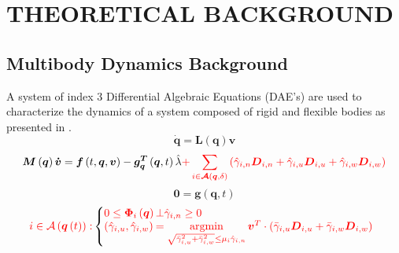 \documentclass[12pt,onecolumn]{report}
\DeclareMathOperator*{\argminB}{argmin}
\begin{document}

\chapter{THEORETICAL BACKGROUND}\label{c:background}

\section{Multibody Dynamics Background}\label{s:MBD}

A system of index 3 Differential Algebraic Equations (DAE's) are used to characterize the dynamics of a system composed of rigid and flexible bodies as presented in \cite{Chrono2016}.
%
\begin{equation}\label{e:LinTrans}
\boldsymbol{\dot{q}}= \boldsymbol{L}\left(\boldsymbol{q}\right)\boldsymbol{v}
\end{equation}
%
\begin{equation}\label{e:ForceBalance}
\boldsymbol{M}\left(\boldsymbol{q}\right)\boldsymbol{\dot{v}} = \boldsymbol{f}\left(t,\boldsymbol{q},\boldsymbol{v}\right) - \boldsymbol{g^T_q} \left(\boldsymbol{q},t\right)\hat{\lambda}  \textcolor{red}{ + \sum\limits_{i \in \boldsymbol{\mathcal{A}}\left(\boldsymbol{q},\delta\right) }\left(\hat\gamma_{i,n}\boldsymbol{D}_{i,n} + \hat\gamma_{i,u}\boldsymbol{D}_{i,u} + \hat\gamma_{i,w}\boldsymbol{D}_{i,w}\right)}
\end{equation}
%
\begin{equation}\label{e:Constraints}
\boldsymbol{0} = \boldsymbol{g}\left(\boldsymbol{q},t\right)
\end{equation}
%
{\color{red}\begin{equation}\label{e:Inequalities}
\textcolor{red}{i \in \mathcal{A}\left(\boldsymbol{q}\left(t\right)\right):}
\left\{
     \begin{array}{@{}l@{\thinspace}l}
      \textcolor{red}{0\le\boldsymbol{\Phi}_i \left(\boldsymbol{q}\right)} &\textcolor{red}{\bot \hat\gamma_{i,n}  \ge 0}\\
      \textcolor{red}{\left(\hat\gamma_{i,u},\hat\gamma_{i,w}\right)} &\textcolor{red}{= \argminB\limits_{\sqrt{\bar\gamma_{i,u}^2 + \bar\gamma_{i,w}^2}\le\mu_i \hat\gamma_{i,n}} \boldsymbol{v}^T \cdot \left(\bar\gamma_{i,u}\boldsymbol{D}_{i,u} + \bar\gamma_{i,w}\boldsymbol{D}_{i,w}\right)} \\
% 
     \end{array}
\right . 
\end{equation}}
\end{document}
